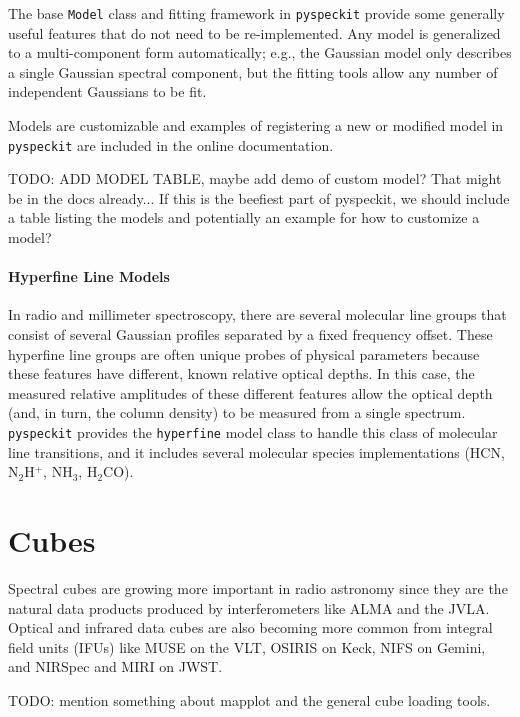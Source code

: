 \documentclass[twocolumn]{aastex62}
\newcommand{\pyspeckit}{\texttt{pyspeckit}\xspace}
\begin{document}
The base \texttt{Model} class and fitting framework in \pyspeckit provide some
generally useful features that do not need to be re-implemented.  Any model is
generalized to a multi-component form automatically; e.g., the Gaussian model
only describes a single Gaussian spectral component, but the fitting tools
allow any number of independent Gaussians to be fit.

Models are customizable and examples of registering a new or modified
model in \pyspeckit are included in the online documentation.

{\color{red}
TODO: ADD MODEL TABLE, maybe add demo of custom model?  That might be in the
docs already...
If this is the beefiest part of pyspeckit, we should include a table
listing the models and potentially an example for how to customize a model?}

\paragraph{Hyperfine Line Models}
In radio and millimeter spectroscopy, there are several molecular line groups
that consist of several Gaussian profiles separated by a fixed frequency
offset.  These hyperfine line groups are often unique probes of physical
parameters because these features have different, known relative optical
depths.  In this case, the measured relative amplitudes of these different
features allow the optical depth (and, in turn, the column density) to be
measured from a single spectrum.  \pyspeckit provides the \texttt{hyperfine}
model class to handle this class of molecular line transitions, and it includes
several molecular species implementations (HCN, N$_2$H$^+$, NH$_3$, H$_2$CO). 




\section{Cubes}
\label{sec:cubes}
Spectral cubes are growing more important in radio astronomy since they are the
natural data products produced by interferometers like ALMA and the JVLA.
Optical and infrared data cubes are also becoming
more common from integral field units (IFUs) like MUSE on
the VLT, OSIRIS on Keck, NIFS on Gemini, and NIRSpec and MIRI on JWST.

{\color{red}TODO: mention something about mapplot and the general cube loading tools.}
\end{document}
